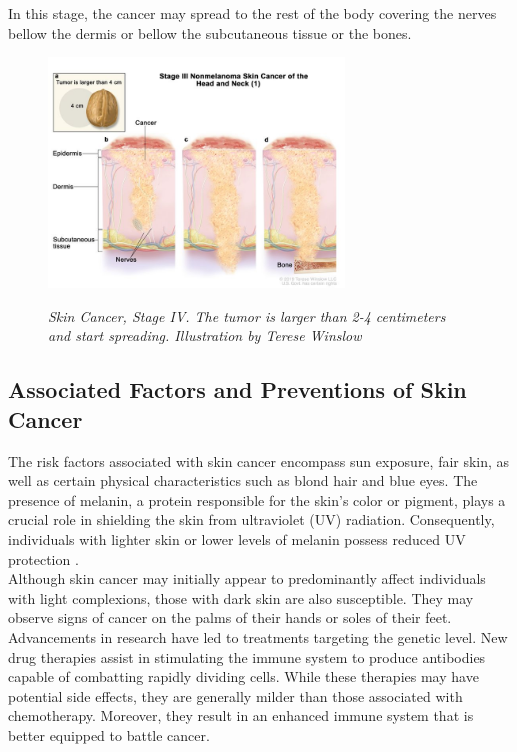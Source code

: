In this stage, the cancer may spread to the rest of the body covering the nerves bellow the dermis or bellow the subcutaneous tissue or the bones.

\begin{figure}[H]
\centering
\includegraphics[width=0.7\textwidth]{imatges/problem_domain/stage3-skin-cancer.jpg}
\caption[Skin Cancer, Stage IV]{\textit{Skin Cancer, Stage IV. The tumor is larger than 2-4 centimeters and start spreading. Illustration by Terese Winslow}}
{\label{fig:stage3-skin-canceer}}
\end{figure}

\newpage

\subsection{Associated Factors and Preventions of Skin Cancer}

The risk factors associated with skin cancer encompass sun exposure, fair skin, as well as certain physical characteristics such as blond hair and blue eyes. The presence of melanin, a protein responsible for the skin's color or pigment, plays a crucial role in shielding the skin from ultraviolet (UV) radiation. Consequently, individuals with lighter skin or lower levels of melanin possess reduced UV protection \cite{OrigenAndTreatment}. \\

Although skin cancer may initially appear to predominantly affect individuals with light complexions, those with dark skin are also susceptible. They may observe signs of cancer on the palms of their hands or soles of their feet. \\

Advancements in research have led to treatments targeting the genetic level. New drug therapies assist in stimulating the immune system to produce antibodies capable of combatting rapidly dividing cells. While these therapies may have potential side effects, they are generally milder than those associated with chemotherapy. Moreover, they result in an enhanced immune system that is better equipped to battle cancer. \\

